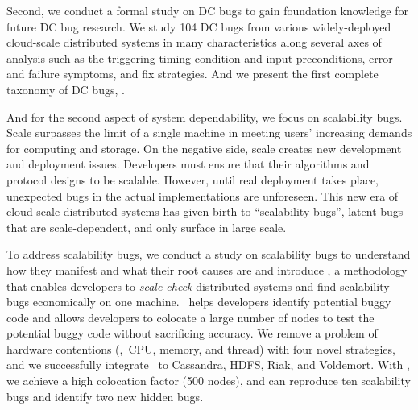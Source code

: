 Second, we conduct a formal study on DC bugs to gain foundation knowledge for
future DC bug research. We study 104 DC bugs from various widely-deployed
cloud-scale distributed systems in many characteristics along several axes of
analysis such as the triggering timing condition and input preconditions, error
and failure symptoms, and fix strategies. And we present the first complete
taxonomy of DC bugs, \taxdc.

And for the second aspect of system dependability, we focus on scalability bugs.
Scale surpasses the limit of a single machine in meeting users' increasing
demands for computing and storage. On the negative side, scale creates new
development and deployment issues. Developers must ensure that their algorithms
and protocol designs to be scalable. However, until real deployment takes place,
unexpected bugs in the actual implementations are unforeseen. This new era of
cloud-scale distributed systems has given birth to ``scalability bugs'', latent
bugs that are scale-dependent, and only surface in large scale.

To address scalability bugs, we conduct a study on scalability bugs to
understand how they manifest and what their root causes are and introduce \sck,
a methodology that enables developers to {\em scale-check} distributed systems
and find scalability bugs economically on one machine. \sck\ helps developers
identify potential buggy code and allows developers to colocate a large number
of nodes to test the potential buggy code without sacrificing accuracy. We
remove a problem of hardware contentions (\ie,\ CPU, memory, and thread) with
four novel strategies, and we successfully integrate \sck\ to Cassandra, HDFS,
Riak, and Voldemort. With \sck, we achieve a high colocation factor (500
nodes), and can reproduce ten scalability bugs and identify two new hidden
bugs.

